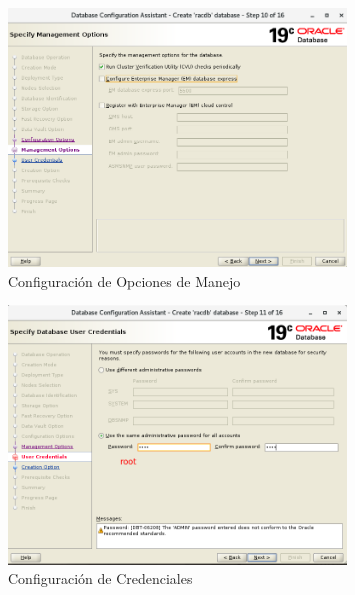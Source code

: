 \documentclass{article}
\begin{document}
\begin{figure}[H]
		\begin{center}
			\includegraphics[width=0.80\textwidth]{db_creation_11_management_options.png}
		\end{center}
		\caption{Configuración de Opciones de Manejo}
\end{figure}


\begin{figure}[H]
		\begin{center}
			\includegraphics[width=0.80\textwidth]{db_creation_12_user_credentials.png}
		\end{center}
		\caption{Configuración de Credenciales}
\end{figure}
\end{document}
